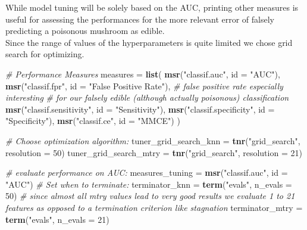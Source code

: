 \documentclass[
]{article}
\newenvironment{Shaded}{\begin{snugshade}}{\end{snugshade}}
\newcommand{\CommentTok}[1]{\textcolor[rgb]{0.56,0.35,0.01}{\textit{#1}}}
\newcommand{\DataTypeTok}[1]{\textcolor[rgb]{0.13,0.29,0.53}{#1}}
\newcommand{\DecValTok}[1]{\textcolor[rgb]{0.00,0.00,0.81}{#1}}
\newcommand{\KeywordTok}[1]{\textcolor[rgb]{0.13,0.29,0.53}{\textbf{#1}}}
\newcommand{\NormalTok}[1]{#1}
\newcommand{\StringTok}[1]{\textcolor[rgb]{0.31,0.60,0.02}{#1}}
\begin{document}
While model tuning will be solely based on the AUC, printing other
measures is useful for assessing the performances for the more relevant
error of falsely predicting a poisonous mushroom as edible.\\
Since the range of values of the hyperparameters is quite limited we
chose grid search for optimizing.

\begin{Shaded}
\begin{Highlighting}[]
\CommentTok{# Performance Measures }
\NormalTok{measures =}\StringTok{ }\KeywordTok{list}\NormalTok{(}
  \KeywordTok{msr}\NormalTok{(}\StringTok{"classif.auc"}\NormalTok{,}
      \DataTypeTok{id =} \StringTok{"AUC"}\NormalTok{),}
  \KeywordTok{msr}\NormalTok{(}\StringTok{"classif.fpr"}\NormalTok{,}
      \DataTypeTok{id =} \StringTok{"False Positive Rate"}\NormalTok{), }\CommentTok{# false positive rate especially interesting}
  \CommentTok{# for our falsely edible (although actually poisonous) classification}
  \KeywordTok{msr}\NormalTok{(}\StringTok{"classif.sensitivity"}\NormalTok{,}
      \DataTypeTok{id =} \StringTok{"Sensitivity"}\NormalTok{),}
  \KeywordTok{msr}\NormalTok{(}\StringTok{"classif.specificity"}\NormalTok{,}
      \DataTypeTok{id =} \StringTok{"Specificity"}\NormalTok{),}
  \KeywordTok{msr}\NormalTok{(}\StringTok{"classif.ce"}\NormalTok{, }
      \DataTypeTok{id =} \StringTok{"MMCE"}\NormalTok{)}
\NormalTok{)}

\CommentTok{# Choose optimization algorithm:}
\NormalTok{tuner_grid_search_knn =}\StringTok{ }\KeywordTok{tnr}\NormalTok{(}\StringTok{"grid_search"}\NormalTok{, }\DataTypeTok{resolution =} \DecValTok{50}\NormalTok{)}
\NormalTok{tuner_grid_search_mtry =}\StringTok{ }\KeywordTok{tnr}\NormalTok{(}\StringTok{"grid_search"}\NormalTok{, }\DataTypeTok{resolution =} \DecValTok{21}\NormalTok{)}

\CommentTok{# evaluate performance on AUC:}
\NormalTok{measures_tuning =}\StringTok{ }\KeywordTok{msr}\NormalTok{(}\StringTok{"classif.auc"}\NormalTok{, }\DataTypeTok{id =} \StringTok{"AUC"}\NormalTok{)}
\CommentTok{# Set when to terminate:}
\NormalTok{terminator_knn =}\StringTok{ }\KeywordTok{term}\NormalTok{(}\StringTok{"evals"}\NormalTok{, }\DataTypeTok{n_evals =} \DecValTok{50}\NormalTok{)}
\CommentTok{# since almost all mtry values lead to very good results we evaluate 1 to 21 features as opposed to a termination criterion like stagnation}
\NormalTok{terminator_mtry =}\StringTok{ }\KeywordTok{term}\NormalTok{(}\StringTok{"evals"}\NormalTok{, }\DataTypeTok{n_evals =} \DecValTok{21}\NormalTok{)  }
\end{Highlighting}
\end{Shaded}
\end{document}
